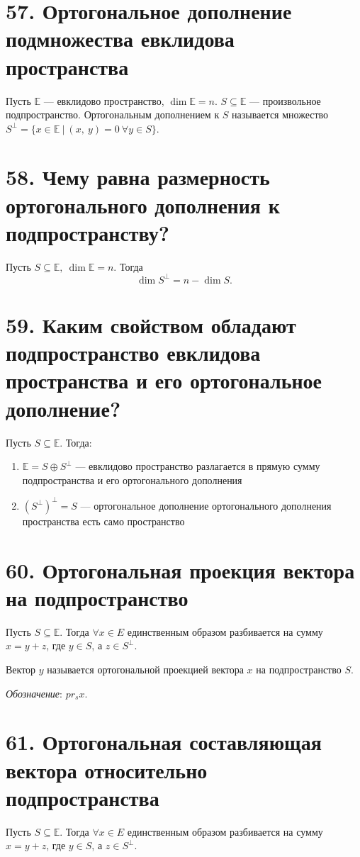 \documentclass[a4paper, 12pt]{article}
\newcommand{\E}{\mathbb{E}}
\begin{document}
\section*{57. Ортогональное дополнение подмножества евклидова пространства}
Пусть $\E$ --- евклидово пространство, $\dim\E = n$. $S \subseteq \E$ --- произвольное подпространство. Ортогональным дополнением к $S$ называется множество $S^\bot = \{x \in \E\ |\ (x,\ y) = 0\ \forall y \in S\}$.

\section*{58. Чему равна размерность ортогонального дополнения к подпространству?}
Пусть $S \subseteq \E,\ \dim\E = n$. Тогда
\vspace{-2mm}
\[
\dim S^{\bot} = n - \dim S.
\]

\section*{59. Каким свойством обладают подпространство евклидова пространства и его ортогональное дополнение?}
Пусть $S \subseteq \E$. Тогда:
\begin{enumerate}
    \itemsep-0.3em
    \item $\E = S \oplus S^\bot$ --- евклидово пространство разлагается в прямую сумму подпространства и его ортогонального дополнения
    \item $(S^\bot)^\bot = S$ --- ортогональное дополнение ортогонального дополнения пространства есть само пространство
\end{enumerate}

\section*{60. Ортогональная проекция вектора на подпространство}
Пусть $S \subseteq \E$. Тогда $\forall x \in E$ единственным образом разбивается на сумму $x = y + z$, где $y \in S$, а $z \in S^\bot$.

Вектор $y$ называется ортогональной проекцией вектора $x$ на подпространство $S$.

\textit{Обозначение}: $pr_sx$.

\section*{61. Ортогональная составляющая вектора относительно подпространства}
Пусть $S \subseteq \E$. Тогда $\forall x \in E$ единственным образом разбивается на сумму $x = y + z$, где $y \in S$, а $z \in S^\bot$.
\end{document}

